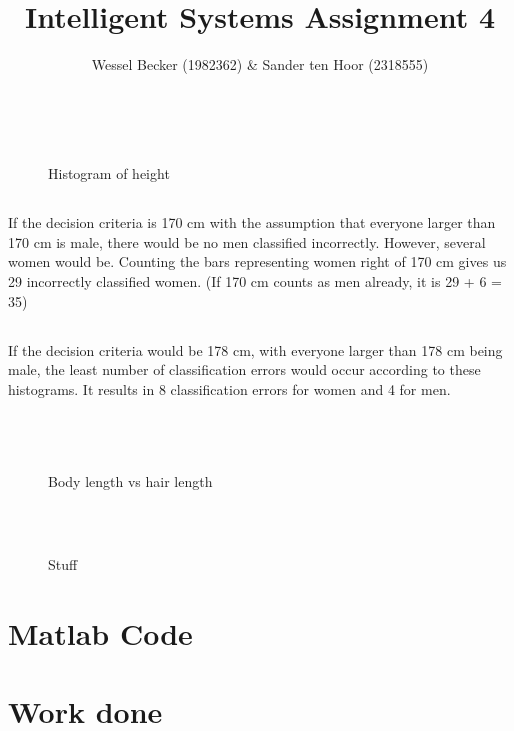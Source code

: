 \documentclass[10pt,a4paper]{article}
\begin{document}
\title{Intelligent Systems Assignment 4}
\author{Wessel Becker (1982362) \& Sander ten Hoor (2318555)}
\maketitle

\newcommand{\simplefigure}[3]{
	\begin{figure}[H]
  	\centering
    	\makebox[\textwidth]
    	{
    		\texttt{[image: \#1]}
 		} \\
  		\caption{#2}
  		\label{#3}
	\end{figure}
}

\section{}
\subsection{}
\simplefigure{./images/1_1}{Histogram of height}{fig:1_1}

\subsection{}
If the decision criteria is 170 cm with the assumption that everyone larger than 170 cm is male, there would be no men classified incorrectly. However, several women would be. Counting the bars representing women right of 170 cm gives us 29 incorrectly classified women.
(If 170 cm counts as men already, it is 29 + 6 = 35)

\subsection{}
If the decision criteria would be 178 cm, with everyone larger than 178 cm being male, the least number of classification errors would occur according to these histograms. It results in 8 classification errors for women and 4 for men.

\section{}
\subsection{}
\simplefigure{./images/2_1}{Body length vs hair length}{fig:2_1}

\subsection{}
\simplefigure{./images/2_2}{Stuff}{fig:2_2}

\section{Matlab Code}

\section{Work done}
\end{document}
